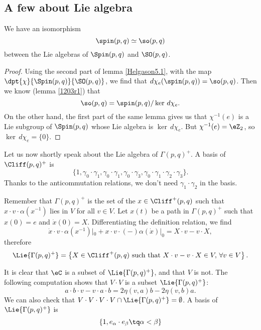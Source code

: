 \subsection{A few about Lie algebra}

\begin{proposition}
We have an isomorphism
\[ 
                    \spin(p,q)\simeq\so(p,q)
\]
between the Lie algebras of $\Spin(p,q)$ and $\SO(p,q)$.
\label{prop:spin_so}   
\end{proposition}

\begin{proof}
Using the second part of lemma \ref{Helgason5.1}, with the map $\dpt{\chi}{\Spin(p,q)}{\SO(p,q)}$, we find that $d\chi_e(\spin(p,q))=\so(p,q)$. Then we know (lemma \ref{1203r1}) that 
\[
	\so(p,q)=\spin(p,q)/\ker\,d\chi_e.
\]
On the other hand, the first part of the same lemma gives us that $\chi^{-1}(e)$ is a Lie subgroup of $\Spin(p,q)$ whose Lie algebra is $\ker\,d\chi_e$. But $\chi^{-1}(e)=\eZ_2$, so $\ker\,d\chi_e=\{0\}$.
\end{proof}

Let us now shortly speak about the Lie algebra of $\Gamma(p,q)^+$. A basis of $\Cliff(p,q)^+$ is \[\{1,\gamma_0\cdot\gamma_1,\gamma_0\cdot\gamma_1 ,\gamma_0\cdot\gamma_3
,\gamma_0\cdot\gamma_1\cdot\gamma_2\cdot\gamma_3  \}.\] Thanks to the anticommutation relations, we don't need $\gamma_1\cdot\gamma_2$ in the basis.

Remember that $\Gamma(p,q)^+$ is the set of the $x\in\Cliff^+(p,q)$ such that $x\cdot v\cdot\alpha(x^{-1})$ lies in $V$ for all $v\in V$. Let $x(t)$ be a path in $\Gamma(p,q)^+$ such that $x(0)=e$ and $\dot{x}(0)=X$. Differentiating the definition relation, we find
 \[
 \dot{x}\cdot v\cdot\alpha(x^{-1})|_0+x\cdot v\cdot(-)\alpha(\dot{x})|_0=X\cdot v-v\cdot X,
 \]
 therefore
\[
  \Lie{\Gamma(p,q)^+}=\left\{X\in\Cliff^+(p,q)\textrm{ such that } X\cdot v-v\cdot X\in V,\,\forall v\in V\right\}.
\]

It is clear that $\eC$ is a subset of $\Lie{\Gamma(p,q)^+}$, and that $V$ is not. The following computation shows that $V\cdot V$ is a subset $\Lie{\Gamma(p,q)^+}$:
\[
         a\cdot b\cdot v-v\cdot a\cdot b=2\eta(v,a)b-2\eta(v,b)a.
\]
 We can also check that $V\cdot V\cdot V\cdot V\cap\Lie{\Gamma(p,q)^+}=\emptyset$. A basis of $\Lie{\Gamma(p,q)^+}$ is
\[
	\{ 1,e_{\alpha}\cdot e_{\beta}\tq \alpha<\beta \}
\]

